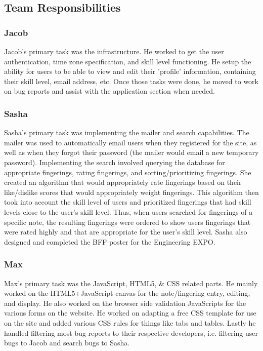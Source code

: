 \documentclass[12pt,english]{article}
\begin{document}
\subsection{Team Responsibilities}
\subsubsection{Jacob}
Jacob's primary task was the infrastructure. He worked to get the
user authentication, time zone specification, and skill level functioning.
He setup the ability for users to be able to view and edit their 'profile'
information, containing their skill level, email address, etc. Once
those tasks were done, he moved to work on bug reports and assist
with the application section when needed.
\subsubsection{Sasha}
Sasha's primary task was implementing the mailer and search capabilities.
The mailer was used to automatically email users when they registered
for the site, as well as when they forgot their password (the mailer
would email a new temporary password). Implementing the search involved
querying the database for appropriate fingerings, rating fingerings,
and sorting/prioritizing fingerings. She created an algorithm that
would appropriately rate fingerings based on their like/dislike scores
that would appropriately weight fingerings. This algorithm then took
into account the skill level of users and prioritized fingerings that
had skill levels close to the user's skill level. Thus, when users
searched for fingerings of a specific note, the resulting fingerings
were ordered to show users fingerings that were rated highly and that
are appropriate for the user's skill level. Sasha also designed and
completed the BFF poster for the Engineering EXPO. 
\subsubsection{Max}
Max's primary task was the JavaScript, HTML5, \& CSS related parts.
He mainly worked on the HTML5+JavaScript canvas for the note/fingering
entry, editing, and display. He also worked on the browser side validation
JavaScripts for the various forms on the website. He worked on adapting
a free CSS template for use on the site and added various CSS rules
for things like tabs and tables. Lastly he handled filtering most
bug reports to their respective developers, i.e. filtering user bugs
to Jacob and search bugs to Sasha.
\end{document}

